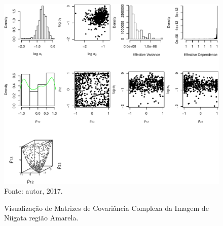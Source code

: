 \documentclass[a4paper,12pt]{article}
\begin{document}







\newpage

\begin{figure}[ht]
\centering
\caption{Visualização de Matrizes de Covariância Complexa da Imagem de Niigata região Amarela.}
\includegraphics[width=\linewidth]{../../Figuras/Amostras-Niigata/Niigata-Amarela-500.pdf}\\
Fonte: autor, 2017.
\label{visNiigata1}
\end{figure}

\newpage
\end{document}
